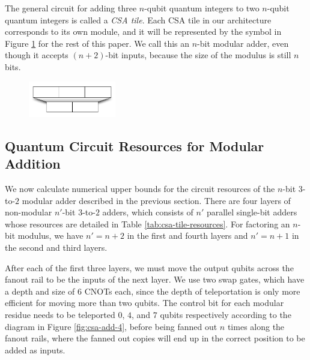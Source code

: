 \documentclass[twoside]{article}
\begin{document}
The general circuit for adding three $n$-qubit quantum integers to
two $n$-qubit quantum integers is called a \emph{CSA tile}. Each CSA tile in our architecture 
corresponds to its own module, and it will be represented by the symbol in 
Figure \ref{fig:csa-tile-symbol} for the rest of this paper. We call this
an $n$-bit modular adder, even though it accepts $(n+2)$-bit inputs, because
the size of the modulus is still $n$ bits.

\begin{center}
\begin{figure}[h!bt]
\centerline{
\includegraphics[width=1.5in]{./csa-tile-symbol.pdf}
}
\label{fig:csa-tile-symbol}
\end{figure}
\end{center}


\subsection{Quantum Circuit Resources for Modular Addition}

We now calculate numerical upper bounds for the circuit resources of
the $n$-bit $3$-to-$2$ modular adder described in the previous section.
There are four layers of non-modular $n'$-bit $3$-to-$2$ adders, which
consists of $n'$ parallel single-bit adders whose
resources are detailed in Table \ref{tab:csa-tile-resources}. For factoring
an $n$-bit modulus, we have $n'=n+2$ in the first and fourth layers
and $n'=n+1$ in the second and third layers.

After each of the first three layers, we must move the output qubits
across the fanout rail to be the inputs of the next layer. We use
two swap gates, which have a depth and size of $6$ CNOTs each, since
the depth of teleportation is only more efficient for moving more than
two qubits. The control bit for each modular residue needs to be
teleported $0$, $4$, and $7$ qubits respectively according to the
diagram in Figure \ref{fig:csa-add-4}, before being fanned out $n$
times along the fanout rails, where the fanned out copies will end up
in the correct position to be added as inputs.

\end{document}
